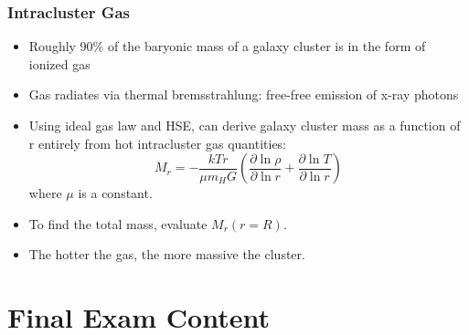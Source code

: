 \documentclass{book}
\begin{document}
\subsection{Intracluster Gas}
\begin{itemize}
    \item Roughly 90\% of the baryonic mass of a galaxy cluster is in the form of ionized gas
    \item Gas radiates via thermal bremsstrahlung: free-free emission of x-ray photons
    \item Using ideal gas law and HSE, can derive galaxy cluster mass as a function of r entirely from hot intracluster gas quantities: $$M_r = - \frac{k T r}{\mu m_H G} \left( \frac{\partial \ln \rho}{\partial \ln r} + \frac{\partial \ln T}{\partial \ln r}\right)$$ where $\mu$ is a constant.
    \item To find the total mass, evaluate $M_r (r = R)$.
    \item The hotter the gas, the more massive the cluster.
\end{itemize}
\chapter{Final Exam Content}
\end{document}
